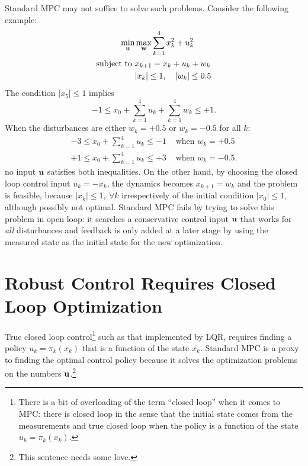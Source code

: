 Standard MPC may not suffice to solve such problems. Consider the following example:
\begin{equation}
  \label{eq:rMPC-unfeasible-problem}
  \begin{aligned}
    \min_{\boldsymbol{\mathrm{u}}} & \max_{\boldsymbol{\mathrm{w}}} \sum_{k=1}^{4} x_k^2+u_k^2 \\
    \text{subject to } & x_{k+1} = x_k + u_k + w_k \\
                     & |x_k| \le 1,\quad |w_k| \le 0.5
  \end{aligned}
\end{equation}
The condition $|x_5| \le 1$ implies
\begin{equation*}
  -1\le x_0 + \sum_{k=1}^4 u_k + \sum_{k=1}^4 w_k \le +1.
\end{equation*}
When the disturbances are either $w_k=+0.5$ or $w_k=-0.5$ for all $k$:
\begin{align*}
  -3 \le x_0 + \sum_{k=1}^4 u_k \le -1 & \text{ when } w_k=+0.5 \\
  +1 \le x_0 + \sum_{k=1}^4 u_k \le +3 & \text{ when } w_k=-0.5.
\end{align*}
no input $\boldsymbol{\mathrm{u}}$ satisfies both inequalities. On the other hand, by choosing the closed loop control input $u_k = -x_k$, the dynamics becomes $x_{k+1}=w_k$ and the problem is feasible, because $|x_k|\le 1,\ \forall k$ irrespectively of the initial condition $|x_0|\le 1$, although possibly not optimal. Standard MPC fails by trying to solve this problem in open loop: it searches a conservative control input $\boldsymbol{\mathrm{u}}$ that works for \emph{all} disturbances and feedback is only added at a later stage by using the measured state as the initial state for the new optimization.

\section{Robust Control Requires Closed Loop Optimization}
\label{sec:closed-loop-robust-control}

True closed loop control\footnote{There is a bit of overloading of the term ``closed loop'' when it comes to MPC: there is closed loop in the sense that the initial state comes from the measurements and true closed loop when the policy is a function of the state $u_k = \pi_k(x_k)$.} such as that implemented by LQR, requires finding a policy $u_k=\pi_k(x_k)$ that is a function of the state $x_k$. Standard MPC is a proxy to finding the optimal control policy because it solves the optimization problems on the numbers $\boldsymbol{\mathrm{u}}$.\footnote{This sentence needs some love.}

